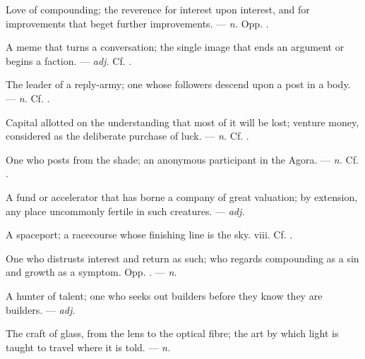  Love of compounding; the reverence for interest upon interest, and for improvements that beget further improvements. ---  \textit{n.} Opp. .

 A meme that turns a conversation; the single image that ends an argument or begins a faction. ---  \textit{adj.} Cf. .

 The leader of a reply-army; one whose followers descend upon a post in a body. ---  \textit{n.} Cf. .

 Capital allotted on the understanding that most of it will be lost; venture money, considered as the deliberate purchase of luck. ---  \textit{n.} Cf. .

 One who posts from the shade; an anonymous participant in the Agora. ---  \textit{n.} Cf. .

  A fund or accelerator that has borne a company of great valuation; by extension, any place uncommonly fertile in such creatures. ---  \textit{adj.}

 A spaceport; a racecourse whose finishing line is the sky.   viii. Cf. .

 One who distrusts interest and return as such; who regards compounding as a sin and growth as a symptom. Opp. . ---  \textit{n.}

 A hunter of talent; one who seeks out builders before they know they are builders. ---  \textit{adj.}

 The craft of glass, from the lens to the optical fibre; the art by which light is taught to travel where it is told. ---  \textit{n.}

